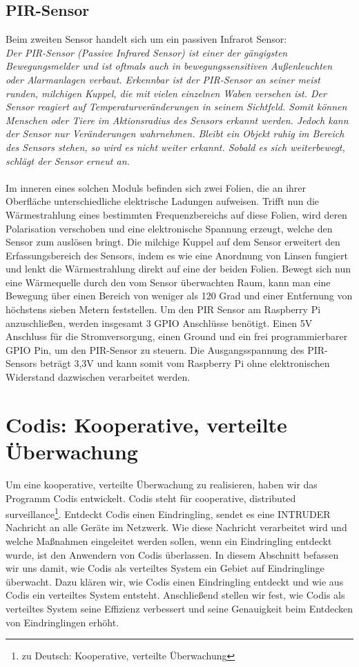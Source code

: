 \documentclass[journal]{IEEEtran}
\begin{document}
\subsection{PIR-Sensor}
Beim zweiten Sensor handelt sich um ein passiven Infrarot Sensor:\\ \textit{Der PIR-Sensor (Passive Infrared Sensor) ist einer der gängigsten Bewegungsmelder und ist oftmals auch in bewegungssensitiven Außenleuchten oder Alarmanlagen verbaut. Erkennbar ist der PIR-Sensor an seiner meist runden, milchigen Kuppel, die mit vielen einzelnen Waben versehen ist. Der Sensor reagiert auf Temperaturveränderungen in seinem Sichtfeld. Somit können Menschen oder Tiere im Aktionsradius des Sensors erkannt werden. Jedoch kann der Sensor nur Veränderungen wahrnehmen. Bleibt ein Objekt ruhig im Bereich des Sensors stehen, so wird es nicht weiter erkannt.  Sobald es sich weiterbewegt, schlägt der Sensor erneut an.}\cite[S. 493]{raspi}\\ \\ Im inneren eines solchen Moduls befinden sich zwei Folien, die an ihrer Oberfläche unterschiedliche elektrische Ladungen aufweisen. Trifft nun die Wärmestrahlung eines bestimmten Frequenzbereichs auf diese Folien, wird deren Polarisation verschoben und eine elektronische Spannung erzeugt, welche den Sensor zum auslösen bringt. Die milchige Kuppel auf dem Sensor erweitert den Erfassungsbereich des Sensors, indem es wie eine Anordnung von Linsen fungiert und lenkt die Wärmestrahlung direkt auf eine der beiden Folien. Bewegt sich nun eine Wärmequelle durch den vom Sensor überwachten Raum, kann man eine Bewegung über einen Bereich von weniger als 120 Grad und einer Entfernung von höchstens sieben Metern feststellen. Um den PIR Sensor am Raspberry Pi anzuschließen, werden insgesamt 3 GPIO Anschlüsse benötigt. Einen 5V Anschluss für die Stromversorgung, einen Ground und ein frei programmierbarer GPIO Pin, um den PIR-Sensor zu steuern. Die Ausgangsspannung des PIR-Sensors beträgt 3,3V und kann somit vom Raspberry Pi ohne elektronischen Widerstand dazwischen verarbeitet werden.


\section{Codis: Kooperative, verteilte Überwachung}

Um eine kooperative, verteilte Überwachung zu realisieren, haben wir das Programm Codis entwickelt. Codis steht für cooperative, distributed surveillance\footnote{zu Deutsch: Kooperative, verteilte Überwachung}. Entdeckt Codis einen Eindringling, sendet es eine \MakeUppercase{intruder} Nachricht an alle Geräte im Netzwerk. Wie diese Nachricht verarbeitet wird und welche Maßnahmen eingeleitet werden sollen, wenn ein Eindringling entdeckt wurde, ist den Anwendern von Codis überlassen. In diesem Abschnitt befassen wir uns damit, wie Codis als verteiltes System ein Gebiet auf Eindringlinge überwacht. Dazu klären wir, wie Codis einen Eindringling entdeckt und wie aus Codis ein verteiltes System entsteht. Anschließend stellen wir fest, wie Codis als verteiltes System seine Effizienz verbessert und seine Genauigkeit beim Entdecken von Eindringlingen erhöht.
\end{document}
